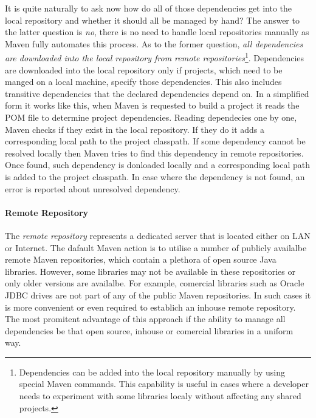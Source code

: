   It is quite naturally to ask now how do all of those dependencies get into the local repository and whether it should all be managed by hand?
  The answer to the latter question is \emph{no}, there is no need to handle local repositories manually as Maven fully automates this process.
  As to the former question, \emph{all dependencies are downloaded into the local repository from remote repositories}\footnote{
    Dependencies can be added into the local repository manually by using special Maven commands. 
    This capability is useful in cases where a developer needs to experiment with some libraries localy without affecting any shared projects.
  }.
  Dependencies are downloaded into the local repository only if projects, which need to be manged on a local machine, specify those dependencies.
  This also includes transitive dependencies that the declared dependencies depend on.
  In a simplified form it works like this, when Maven is requested to build a project it reads the POM file to determine project dependencies.
  Reading dependecies one by one, Maven checks if they exist in the local repository.
  If they do it adds a corresponding local path to the project classpath.
  If some dependency cannot be resolved locally then Maven tries to find this dependency in remote repositories.
  Once found, such dependency is donloaded locally and a corresponding local path is added to the project classpath.
  In case where the dependency is not found, an error is reported about unresolved dependency.

  \paragraph*{Remote Repository}
  
  The \emph{remote repository} represents a dedicated server that is located either on LAN or Internet.
  The dafault Maven action is to utilise a number of publicly availalbe remote Maven repositories, which contain a plethora of open source Java libraries.
  However, some libraries may not be available in these repositories or only older versions are availalbe.
  For example, comercial libraries such as Oracle JDBC drives are not part of any of the public Maven repositories.
  In such cases it is more convenient or even required to establich an inhouse remote repository.
  The most promitent advantage of this approach if the ability to manage all dependencies be that open source, inhouse or comercial libraries in a uniform way.
  
